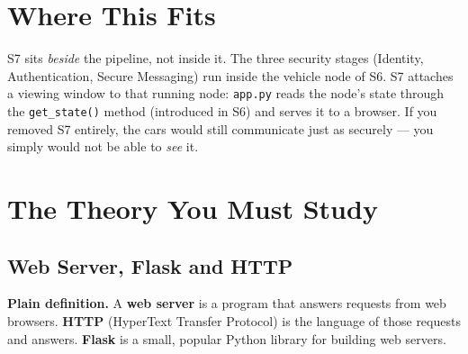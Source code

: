 \documentclass[11pt,a4paper]{report}
\begin{document}
\section{Where This Fits}

S7 sits \emph{beside} the pipeline, not inside it. The three security stages
(Identity, Authentication, Secure Messaging) run inside the vehicle node of S6.
S7 attaches a viewing window to that running node: \texttt{app.py} reads the
node's state through the \texttt{get\_state()} method (introduced in S6) and
serves it to a browser. If you removed S7 entirely, the cars would still
communicate just as securely --- you simply would not be able to \emph{see} it.

\begin{center}
\end{center}

\section{The Theory You Must Study}

\subsection{Web Server, Flask and HTTP}
\textbf{Plain definition.} A \textbf{web server} is a program that answers
requests from web browsers. \textbf{HTTP} (HyperText Transfer Protocol) is the
language of those requests and answers. \textbf{Flask} is a small, popular Python
library for building web servers.
\end{document}
